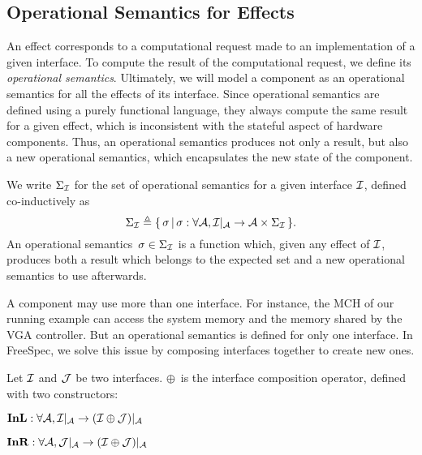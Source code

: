 \subsection{Operational Semantics for Effects}

An effect corresponds to a computational request made to an implementation of a
given interface.
%
To compute the result of the computational request, we define its
\emph{operational semantics}.
%
Ultimately, we will model a component as an operational semantics for all the
effects of its interface.
%
Since operational semantics are defined using a purely functional language, they
always compute the same result for a given effect, which is inconsistent with
the stateful aspect of hardware components.
%
Thus, an operational semantics produces not only a result, but also a new
operational semantics, which encapsulates the new state of the component.

\begin{definition}
  We write $\Sigma_{\mathcal{I}}$ for the set of operational semantics for a
  given interface $\mathcal{I}$, defined co-inductively as
  \[
    \Sigma_{\mathcal{I}} \triangleq \{\,\sigma\,|\,\sigma : \forall \mathcal{A},
    \mathcal{I}|_{\mathcal{A}} \rightarrow \mathcal{A} \times \Sigma_{\mathcal{I}} \,\}.
  \]
  An operational semantics~$\sigma \in \Sigma_{\mathcal{I}}$ is a function which, given
  any effect of $\mathcal{I}$, produces both a result which belongs to the expected
  set and a new operational semantics to use afterwards.
\end{definition}

A component may use more than one interface.
%
For instance, the MCH of our running example can access the system memory and
the memory shared by the VGA controller.
%
But an operational semantics is defined for only one interface.
%
In FreeSpec, we solve this issue by composing interfaces together to create new
ones.

\begin{definition}
  Let $\mathcal{I}$ and $\mathcal{J}$ be two interfaces. $\oplus$~is the interface
  composition operator, defined with two constructors:
  \begin{compactitem}
  \item $\mathbf{\mathbf{InL}} : \forall \mathcal{A}, \mathcal{I}|_{\mathcal{A}}
  \rightarrow (\mathcal{I} \oplus \mathcal{J})|_{\mathcal{A}}$
  \item $\mathbf{\mathbf{InR}} : \forall \mathcal{A}, \mathcal{J}|_{\mathcal{A}}
  \rightarrow (\mathcal{I} \oplus \mathcal{J})|_{\mathcal{A}}$
  \end{compactitem}
\end{definition}

